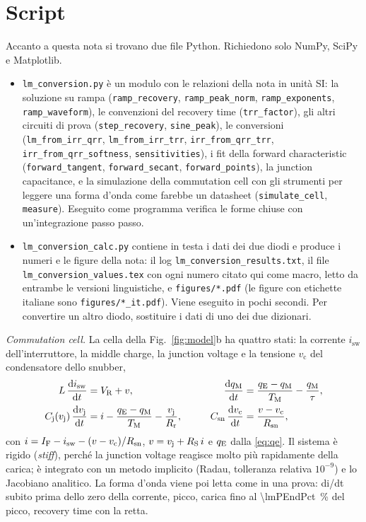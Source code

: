 \documentclass[10pt,a4paper]{scrartcl}
\let\newcommand\lmitdefine
\newcommand{\IF}{I_\mathrm{F}}
\newcommand{\VR}{V_\mathrm{R}}
\newcommand{\TM}{T_\mathrm{M}}
\newcommand{\qE}{q_\mathrm{E}}
\newcommand{\qM}{q_\mathrm{M}}
\newcommand{\vj}{v_\mathrm{j}}
\newcommand{\RS}{R_\mathrm{S}}
\newcommand{\Rr}{R_\mathrm{r}}
\newcommand{\Cj}{C_\mathrm{j}}
\newcommand{\Csn}{C_\mathrm{sn}}
\newcommand{\Rsn}{R_\mathrm{sn}}
\newcommand{\diff}{\mathrm{d}}
\begin{document}
\section{Script}
\label{app:scripts}
Accanto a questa nota si trovano due file Python. Richiedono solo NumPy, SciPy e Matplotlib.
\begin{itemize}
\emergencystretch=3em
\item \texttt{lm\_conversion.py} è un modulo con le relazioni della nota in unità SI: la soluzione su rampa (\texttt{ramp\_recovery}, \texttt{ramp\_peak\_norm}, \texttt{ramp\_exponents}, \texttt{ramp\_waveform}), le convenzioni del recovery time (\texttt{trr\_factor}), gli altri circuiti di prova (\texttt{step\_recovery}, \texttt{sine\_peak}), le conversioni (\texttt{lm\_from\_irr\_qrr}, \texttt{lm\_from\_irr\_trr}, \texttt{irr\_from\_qrr\_trr}, \texttt{irr\_from\_qrr\_softness}, \texttt{sensitivities}), i fit della forward characteristic (\texttt{forward\_tangent}, \texttt{forward\_secant}, \texttt{forward\_points}), la junction capacitance, e la simulazione della commutation cell con gli strumenti per leggere una forma d'onda come farebbe un datasheet (\texttt{simulate\_cell}, \texttt{measure}). Eseguito come programma verifica le forme chiuse con un'integrazione passo passo.
\item \texttt{lm\_conversion\_calc.py} contiene in testa i dati dei due diodi e produce i numeri e le figure della nota: il log \texttt{lm\_conversion\_results.txt}, il file \texttt{lm\_conversion\_values.tex} con ogni numero citato qui come macro, letto da entrambe le versioni linguistiche, e \texttt{figures/*.pdf} (le figure con etichette italiane sono \texttt{figures/*\_it.pdf}). Viene eseguito in pochi secondi. Per convertire un altro diodo, sostituire i dati di uno dei due dizionari.
\end{itemize}

\emph{Commutation cell.} La cella della Fig.~\ref{fig:model}b ha quattro stati: la corrente $i_\mathrm{sw}$ dell'interruttore, la middle charge, la junction voltage e la tensione $v_\mathrm{c}$ del condensatore dello snubber,
\begin{equation}
\begin{aligned}
L\,\frac{\diff i_\mathrm{sw}}{\diff t} &= \VR + v , &\qquad \frac{\diff\qM}{\diff t} &= \frac{\qE-\qM}{\TM} - \frac{\qM}{\tau} , \\
\Cj(\vj)\,\frac{\diff\vj}{\diff t} &= i - \frac{\qE-\qM}{\TM} - \frac{\vj}{\Rr} , &\qquad \Csn\,\frac{\diff v_\mathrm{c}}{\diff t} &= \frac{v - v_\mathrm{c}}{\Rsn} ,
\end{aligned}
\end{equation}
con $i = \IF - i_\mathrm{sw} - (v-v_\mathrm{c})/\Rsn$, $v = \vj + \RS\,i$ e $\qE$ dalla \eqref{eq:qe}. Il sistema è rigido (\emph{stiff}), perché la junction voltage reagisce molto più rapidamente della carica; è integrato con un metodo implicito (Radau, tolleranza relativa $10^{-9}$) e lo Jacobiano analitico. La forma d'onda viene poi letta come in una prova: di/dt subito prima dello zero della corrente, picco, carica fino al \SI{\lmPEndPct}{\percent} del picco, recovery time con la retta.
\end{document}
